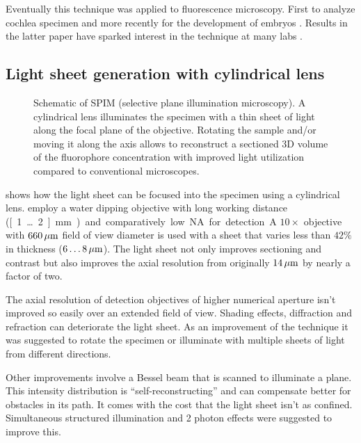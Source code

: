 Eventually this technique was applied to fluorescence
microscopy. First to analyze cochlea specimen \citep{Voie1993} and
more recently for the development of embryos
\citep{Huisken2004}. Results in the latter paper have sparked interest
in the technique at many labs \citep{Santi2011}.
\subsection{Light sheet generation with cylindrical lens}
\begin{figure}[!hbt]
  \centering
  
  \caption{Schematic of SPIM (selective plane illumination
    microscopy). A cylindrical lens illuminates the specimen with a
    thin sheet of light along the focal plane of the
    objective. Rotating the sample and/or moving it along the axis
    allows to reconstruct a sectioned 3D volume of the fluorophore
    concentration with improved light utilization compared to
    conventional microscopes.}
  \label{fig:spim}
\end{figure}
 shows how the light sheet can be focused into the
specimen using a cylindrical lens. \cite{Huisken2004} employ a water
dipping objective with long working distance (\unit[1\ldots 2]{mm})
and comparatively low NA for detection. A $10\times$ objective with
$\unit[660]{\mu m}$ field of view diameter is used with a sheet that
varies less than $42\%$ in thickness ($\unit[6\ldots 8]{\mu m}$). The
light sheet not only improves sectioning and contrast but also
improves the axial resolution from originally $\unit[14]{\mu m}$ by
nearly a factor of two.


The axial resolution of detection objectives of higher numerical
aperture isn't improved so easily over an extended field of
view. Shading effects, diffraction and refraction can deteriorate the
light sheet. As an improvement of the technique it was suggested to
rotate the specimen or illuminate with multiple sheets of light from
different directions.

Other improvements involve a Bessel beam that is scanned to illuminate
a plane. This intensity distribution is ``self-reconstructing'' and
can compensate better for obstacles in its path. It comes with the
cost that the light sheet isn't as confined. Simultaneous structured
illumination and 2 photon effects were suggested to improve this.


